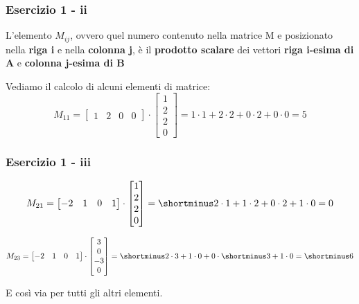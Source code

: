 \documentclass{beamer}
\begin{document}
\begin{frame}
\frametitle{Esercizio 1 - ii}

    L'elemento $M_{ij}$, ovvero quel numero contenuto nella matrice M e posizionato nella \textbf{riga i} e nella
    \textbf{colonna j}, \`e il \textbf{prodotto scalare} dei vettori \textbf{riga i-esima di A} e \textbf{colonna j-esima di B}


Vediamo il calcolo di alcuni elementi di matrice:
\begin{displaymath}
    M_{11} =
\begin{bmatrix}
    1 &  2 &  0 &  0
\end{bmatrix}
\cdot
\begin{bmatrix}
    1 \\  2 \\ 2 \\ 0
\end{bmatrix}
 = 1 \cdot 1 + 2 \cdot 2 + 0 \cdot 2 + 0 \cdot 0
 = 5
\end{displaymath}

\end{frame}

\begin{frame}
\frametitle{Esercizio 1 - iii}

\begin{displaymath}
    M_{21} =
\begin{bmatrix}
    -2 & 1 &  0 &  1
\end{bmatrix}
\cdot
\begin{bmatrix}
    1 \\  2 \\ 2 \\ 0
\end{bmatrix}
 = \shortminus 2 \cdot 1 + 1 \cdot 2 + 0 \cdot 2 + 1 \cdot 0
 = 0
\end{displaymath}


\begin{displaymath}
    M_{23} =
\begin{bmatrix}
    -2 & 1 &  0 &  1
\end{bmatrix}
\cdot
\begin{bmatrix}
    3 \\  0 \\ -3 \\ 0
\end{bmatrix}
 = \shortminus 2 \cdot 3 + 1 \cdot 0 + 0 \cdot \shortminus 3 + 1 \cdot 0
 = \shortminus 6
\end{displaymath}

E cos\`i via per tutti gli altri elementi.
\end{frame}
\end{document}
